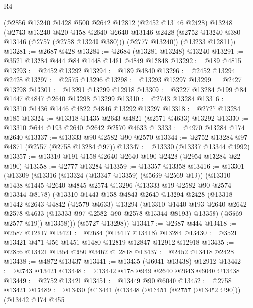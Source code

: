 \begin{lexlean}{R4}
\begin{coremodule}
    (@2856
      @13240
      @1428
      @500
      @2642
      @12812
      (@2452 @13146 @2428)
      @13248
      (@2743
        @13240
        @420
        @158
        @2640
        @2640
        @13146
        @2428
        (@2752 @13240 @380 @13146 (@2757 (@2758 @13240 @380)))
        (@2777 @13240))
      (@13233 @12811))
@13281 := @2687 @428
@13284 := @2684 (@13281 @13248) @13240
@13291 := @3521 @13284 @444 @84 @1448 @1481 @4849 @12848
@13292 := @189 @4815
@13293 := @2452 @13292
@13294 := @189 @4840
@13296 := @2452 @13294 @2428
@13297 := @2575 @13296
@13298 := @13293 @13297
@13299 := @2427 @13298
@13301 := @13291 @13299 @12918
@13309 := @3227 @13284 @199 @84 @1447 @4847 @2640 @13298 @13299
@13310 := @2743 @13284
@13316 := @13310 @1436 @1446 @4822 @4846 @13292 @13297
@13318 := @2727 @13284 @185
@13324 := @13318 @1435 @2643 @4821 (@2571 @4633) @13292
@13330 := @13310 @644 @193 @2640 @2642 @2570 @4633
@13333 := @4970 @13284 @174 @2640
@13337 := @13333 @90 @2582 @90 @2570
@13344 := @2752 @13284 @97 @4871 (@2757 (@2758 @13284 @97))
@13347 := @13330 (@13337 @13344 @4992)
@13357 := @13310 @191 @158 @2640 @2640 @190 @2428 (@2954 @13284 @22 @190)
@13358 := @2777 @13284
@13359 := @13357 @13358
@13416 := @13301
    (@13309
      (@13316
        (@13324 (@13347 @13359) (@5669 @2569 @19))
        (@13310
          @1438
          @1445
          @2640
          @4845
          @2574
          @13296
          (@13333 @19 @2582 @90 @2574 @13344 @8178)
          (@13310
            @1443
            @158
            @4843
            @2640
            @13294
            @2428
            (@13318
              @1442
              @2643
              @4842
              (@2579 @4633)
              @13294
              (@13310
                @1440
                @193
                @2640
                @2642
                @2578
                @4633
                (@13333 @97 @2582 @90 @2578 @13344 @8193)
                @13359)
              (@5669 @2577 @19))
            @13358)))
      (@5727 @13298))
@13417 := @2687 @444
@13418 := @2587 @12817
@13421 := @2684 (@13417 @13418) @13284
@13430 := @3521 @13421 @471 @56 @1451 @1480 @12819 @12847 @12912 @12918
@13435 := @2856 @13421 @1354 @950 @3462 @12818
@13437 := @2452 @13418 @2428
@13438 := @4872 @13437
@13441 := @13435 (@6041 @13438) @12912
@13442 := @2743 @13421
@13448 := @13442 @178 @949 @2640 @2643 @6040 @13438
@13449 := @2752 @13421
@13451 := @13449 @90 @6040
@13452 := @2758 @13421
@13489 := @13430
    (@13441
      (@13448
        (@13451 (@2757 (@13452 @90)))
        (@13442
          @174
          @455

\end{coremodule}
\end{lexlean}
